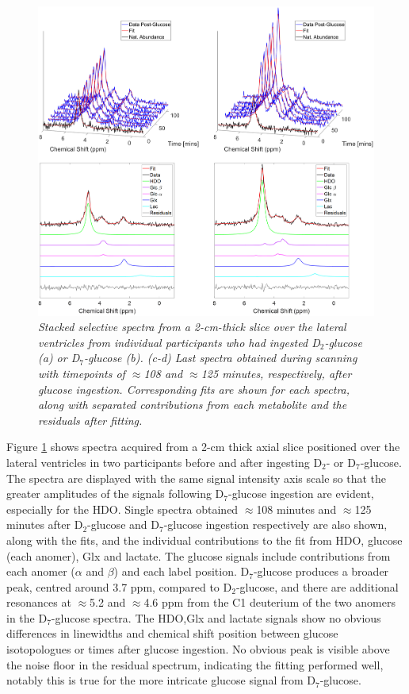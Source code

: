 \begin{figure}
    \centering
    \includegraphics[width = 1\textwidth]{Figures/Glucose/Selective.png}
    \caption{\textit{Stacked selective spectra from a 2-cm-thick slice over the lateral ventricles from individual participants who had ingested D$_2$-glucose (a) or D$_7$-glucose (b). (c-d) Last spectra obtained during scanning with timepoints of $\approx$108 and $\approx$125 minutes, respectively, after glucose ingestion. Corresponding fits are shown for each spectra, along with separated contributions from each metabolite and the residuals after fitting.}}
    \label{fig:Glu:Select}
\end{figure}

Figure \ref{fig:Glu:Select} shows spectra acquired from a 2-cm thick axial slice positioned over the lateral ventricles in two participants before and after ingesting D$_2$- or D$_7$-glucose. The spectra are displayed with the same signal intensity axis scale so that the greater amplitudes of the signals following D$_7$-glucose ingestion are evident, especially for the \ac{HDO}. Single spectra obtained $\approx$108 minutes and $\approx$125 minutes after D$_2$-glucose and D$_7$-glucose ingestion respectively are also shown, along with the fits, and the individual contributions to the fit from \ac{HDO}, glucose (each anomer), Glx and lactate. The glucose signals include contributions from each anomer ($\alpha$ and $\beta$) and each label position. D$_7$-glucose produces a broader peak, centred around 3.7 ppm, compared to D$_2$-glucose, and there are additional resonances at $\approx$5.2 and $\approx$4.6 ppm from the C1 deuterium of the two anomers in the D$_7$-glucose spectra. The \ac{HDO},Glx and lactate signals show no obvious differences in linewidths and chemical shift position between glucose isotopologues or times after glucose ingestion. No obvious peak is visible above the noise floor in the residual spectrum, indicating the fitting performed well, notably this is true for the more intricate glucose signal from D$_7$-glucose.


